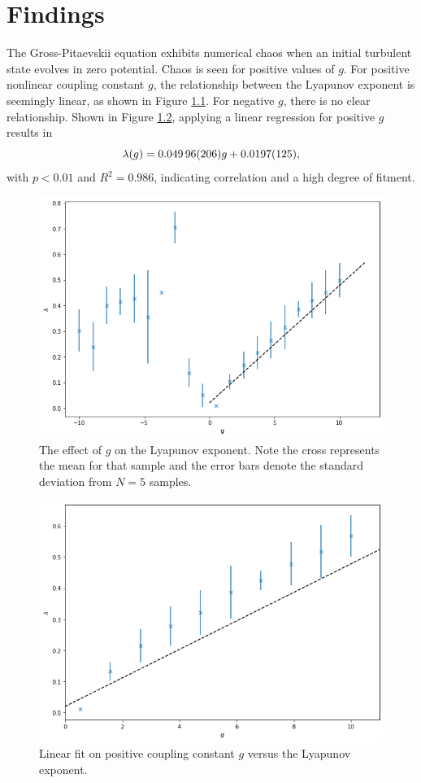 \addchapheadtotoc

\chapter{Findings}
The Gross-Pitaevskii equation exhibits numerical chaos when an initial turbulent state evolves in zero potential. Chaos is seen for positive values of $g$. For positive nonlinear coupling constant $g$, the relationship between the Lyapunov exponent is seemingly linear, as shown in Figure \ref{fig:glam}. For negative $g$, there is no clear relationship. Shown in Figure \ref{fig:gline}, applying a linear regression for positive $g$ results in \begin{equation}
	\lambda(g) = \num{0.04996 \pm 0.00206} g + \num{0.0197 \pm 0.0125},
\end{equation}
with $p<0.01$ and $R^2=0.986$, indicating correlation and a high degree of fitment. 
\begin{figure}[p]
	\centering
	\includegraphics[width=0.7\linewidth]{chapter4/g_lam}
	\caption{The effect of $g$ on the Lyapunov exponent. Note the cross represents the mean for that sample and the error bars denote the standard deviation from $N=5$ samples.}
	\label{fig:glam}
\end{figure}

\begin{figure}[p]
	\centering
	\includegraphics[width=0.7\linewidth]{chapter4/g_line}
	\caption{Linear fit on positive coupling constant $g$ versus the Lyapunov exponent.}
	\label{fig:gline}
\end{figure}



